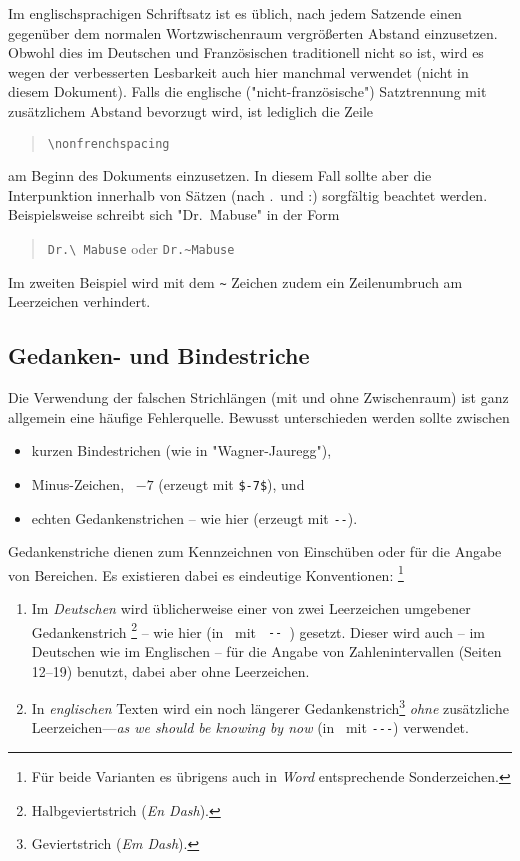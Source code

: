 Im englischsprachigen Schriftsatz ist es üblich, nach jedem Satzende einen
gegenüber dem normalen Wortzwischenraum vergrößerten Abstand einzusetzen.
Obwohl dies im Deutschen und Französischen traditionell nicht so ist, wird es
wegen der verbesserten Lesbarkeit auch hier manchmal verwendet (nicht in
diesem Dokument). Falls die englische ("nicht-französische") Satztrennung mit
zusätzlichem Abstand bevorzugt wird, ist lediglich die Zeile
%
\begin{quote}
    \verb!\nonfrenchspacing!
\end{quote}
%
am Beginn des Dokuments einzusetzen. In diesem Fall sollte aber die
Interpunktion innerhalb von Sätzen (nach .\ und :) sorgfältig beachtet werden.
Beispielsweise schreibt sich "Dr.\ Mabuse" in der Form
%
\begin{quote}
    \verb!Dr.\ Mabuse! oder \verb!Dr.~Mabuse!
\end{quote}
%
Im zweiten Beispiel wird mit dem \verb!~! Zeichen zudem ein Zeilenumbruch am
Leerzeichen verhindert.

\subsection{Gedanken- und Bindestriche}
\label{sec:gedankenstrich}

Die Verwendung der falschen Strichlängen (mit und ohne Zwischenraum) ist ganz
allgemein eine häufige Fehlerquelle. Bewusst unterschieden werden sollte
zwischen
%
\begin{itemize}
    \item kurzen Bindestrichen (wie in "Wagner-Jauregg"), %
    \item Minus-Zeichen, \zB\ $-7$ (erzeugt mit \verb!$-7$!), und %
    \item echten Gedankenstrichen -- wie hier (erzeugt mit \verb!--!).
\end{itemize}
%
\noindent
Gedankenstriche dienen zum Kennzeichnen von Einschüben oder für die Angabe von
Bereichen. Es existieren dabei es eindeutige Konventionen:%
\footnote{Für beide Varianten es übrigens auch in \emph{Word} entsprechende
Sonderzeichen.}
%
\begin{enumerate}
    \item Im \emph{Deutschen} wird üblicherweise einer von zwei
    Leerzeichen umgebener Gedankenstrich%
    \footnote{Halbgeviertstrich (\emph{En Dash}).} -- wie hier (in \latex\ mit
	{\verb*! -- !}) gesetzt. Dieser wird auch -- im Deutschen wie im Englischen
	-- für die Angabe von Zahlenintervallen (Seiten 12--19) benutzt, dabei aber
	ohne Leerzeichen.
%
    \item In \emph{englischen} Texten wird ein noch längerer
    Gedankenstrich\footnote{Geviertstrich (\emph{Em Dash}).} \emph{ohne}
    zusätzliche Leerzeichen---\emph{as we should be knowing by now}
    (in \latex\ mit {\verb*!---!}) verwendet.
%
\end{enumerate}

